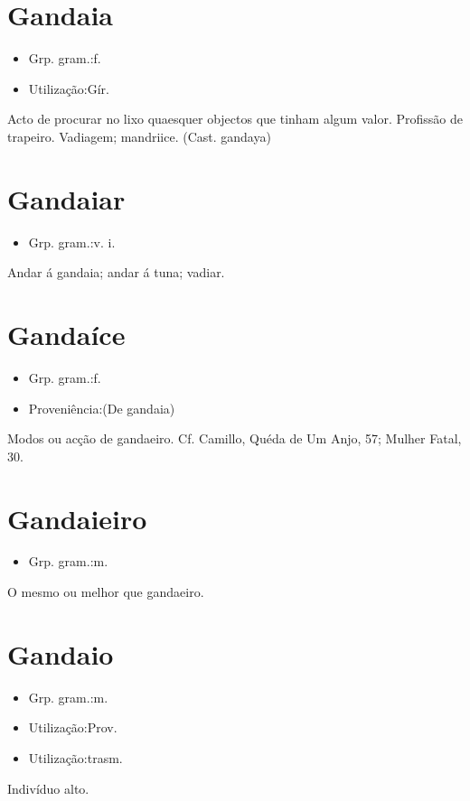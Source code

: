 \section{Gandaia}
\begin{itemize}
\item {Grp. gram.:f.}
\end{itemize}
\begin{itemize}
\item {Utilização:Gír.}
\end{itemize}
Acto de procurar no lixo quaesquer objectos que tinham algum valor.
Profissão de trapeiro.
Vadiagem; mandriice.
(Cast. \textunderscore gandaya\textunderscore )
\section{Gandaiar}
\begin{itemize}
\item {Grp. gram.:v. i.}
\end{itemize}
Andar á gandaia; andar á tuna; vadiar.
\section{Gandaíce}
\begin{itemize}
\item {Grp. gram.:f.}
\end{itemize}
\begin{itemize}
\item {Proveniência:(De \textunderscore gandaia\textunderscore )}
\end{itemize}
Modos ou acção de gandaeiro. Cf. Camillo, \textunderscore Quéda de Um Anjo\textunderscore , 57; \textunderscore Mulher Fatal\textunderscore , 30.
\section{Gandaieiro}
\begin{itemize}
\item {Grp. gram.:m.}
\end{itemize}
O mesmo ou melhor que \textunderscore gandaeiro\textunderscore .
\section{Gandaio}
\begin{itemize}
\item {Grp. gram.:m.}
\end{itemize}
\begin{itemize}
\item {Utilização:Prov.}
\end{itemize}
\begin{itemize}
\item {Utilização:trasm.}
\end{itemize}
Indivíduo alto.
